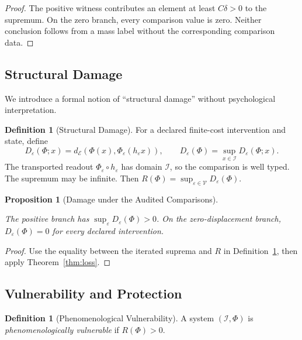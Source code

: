 \documentclass[11pt,a4paper]{article}
\theoremstyle{plain}
\newtheorem{proposition}[theorem]{Proposition}
\theoremstyle{definition}
\newtheorem{definition}[theorem]{Definition}
\theoremstyle{remark}
\begin{document}
\begin{proof}
The positive witness contributes an element at least $C\delta>0$ to the supremum. On the zero branch, every comparison value is zero. Neither conclusion follows from a mass label without the corresponding comparison data.
\end{proof}

\subsection{Structural Damage}

We introduce a formal notion of ``structural damage'' without psychological interpretation.

\begin{definition}[Structural Damage]\label{def:damage}
For a declared finite-cost intervention and state, define
\[
D_\varepsilon(\Phi;x)=d_{\mathcal E}(\Phi(x),\Phi_\varepsilon(h_\varepsilon x)),
\qquad D_\varepsilon(\Phi)=\sup_{x\in\mathcal I}D_\varepsilon(\Phi;x).
\]
The transported readout $\Phi_\varepsilon\circ h_\varepsilon$ has domain $\mathcal I$, so the comparison is well typed. The supremum may be infinite. Then $R(\Phi)=\sup_{\varepsilon\in\mathcal V}D_\varepsilon(\Phi)$.
\end{definition}

\begin{proposition}[Damage under the Audited Comparisons]\label{prop:damage-char}\leavevmode\par
The positive branch has $\sup_\varepsilon D_\varepsilon(\Phi)>0$. On the zero-displacement branch, $D_\varepsilon(\Phi)=0$ for every declared intervention.
\end{proposition}

\begin{proof}
Use the equality between the iterated suprema and $R$ in Definition~\ref{def:damage}, then apply Theorem~\ref{thm:loss}.
\end{proof}

\subsection{Vulnerability and Protection}

\begin{definition}[Phenomenological Vulnerability]\label{def:vulnerability}
A system $(\mathcal{I}, \Phi)$ is \textit{phenomenologically vulnerable} if $R(\Phi) > 0$.
\end{definition}
\end{document}
